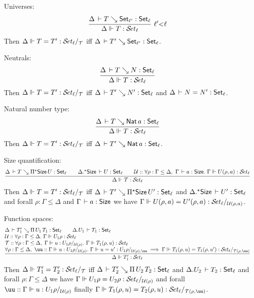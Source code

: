\documentclass[acmlarge,review,anonymous]{acmart}\settopmatter{printfolios=true}
\begin{document}
\begin{caselist}

\nextcase Universes:
\[
  \rux{\Delta \der T \evalsto \Set[\ell'] : \Set[\ell]
     }{\sty \Delta T \ell
     }{\ell' {<} \ell}
\]
Then $\steqd \Delta T {T'} \ell {\T}$ iff $\Delta \der T' \evalsto \Set[\ell'] : \Set[\ell]$.

\nextcase Neutrals:
\[
  \ru{\Delta \der T \evalsto N : \Set[\ell]
    }{\sty \Delta T \ell}
\]
Then $\steqd \Delta T {T'} \ell {\T}$ iff $\Delta \der T' \evalsto N' : \Set[\ell]$ and
$\Delta \der N = N' : \Set[\ell]$.

\nextcase Natural number type:
\[
  \ru{\Delta \der T \evalsto \Nat a : \Set[\ell]
    }{\sty \Delta T \ell}
\]
Then $\steqd \Delta T {T'} \ell {\T}$ iff $\Delta \der T' \evalsto \Nat a : \Set[\ell]$.

\nextcase Size quantification:
\[
  \rul{\Delta \der T \evalsto \epiT \Size U : \Set[\ell] \qquad
       \eext \Delta \Size \der U : \Set[\ell] \qquad
      \U :: \forall \rho : \Gamma \leq \Delta,~\Gamma \der a : \Size.~
        \sty \Gamma {U(\rho,a)} \ell \\
    }{\sty \Delta {T} \ell}
\]
Then $\steqd \Delta T {T'} \ell {\T}$ iff $\Delta \der T' \evalsto \epiT \Size {U'} : \Set[\ell]$
and $\eext \Delta \Size \der U' : \Set[\ell]$ and forall $\rho : \Gamma \leq \Delta$ and $\Gamma \der a : \Size$ we have $\steqd \Gamma {U(\rho,a)} {U'(\rho,a)} \ell {\U(\rho,a)}$.

\nextcase Function spaces:
\[
  \rul{\Delta \der T_1' \evalsto \piT {U_1} {T_1} : \Set[\ell] \qquad \cext \Delta U_1 \der T_1 : \Set[\ell] \\ \relax
      \U :: \forall \rho : \Gamma \leq \Delta.~ \sty{\Gamma}{U_1\rho} {\ell} \\ \relax
      \T :: \forall \rho : \Gamma \leq \Delta,~\sttmd \Gamma u {U_1\rho} {\U(\rho)}.~
        \sty \Gamma {T_1(\rho,u)} \ell \\
      \forall \rho : \Gamma \leq \Delta,~ \uu :: \sttmd \Gamma u {U_1\rho} {\U(\rho)}.~
        \sttmeqd \Gamma u {u'} {U_1\rho} {\U(\rho)} {\uu} \implies
        \steqd \Gamma {T_1(\rho,u)} {T_1(\rho,u')} \ell {\T(\rho,\uu)}
    }{\sty \Delta {T_1'} \ell}
\]
Then $\steqd \Delta {T_1'} {T_2'} \ell {\T}$ iff $\Delta \der T_2' \evalsto \piT{U_2}{T_2} : \Set[\ell]$ and
$\cext \Delta{U_2} \der T_2 : \Set[\ell]$ and
forall $\rho : \Gamma \leq \Delta$ we have $\steqd \Gamma {U_1\rho} {U_2\rho} \ell {\U(\rho)}$
and forall $\uu :: \sttmd \Gamma u {U_1\rho} {\U(\rho)}$ finally
$\steqd \Gamma {T_1(\rho,u)} {T_2(\rho,u)} \ell {\T(\rho,\uu)}$.

\end{caselist}
\end{document}
